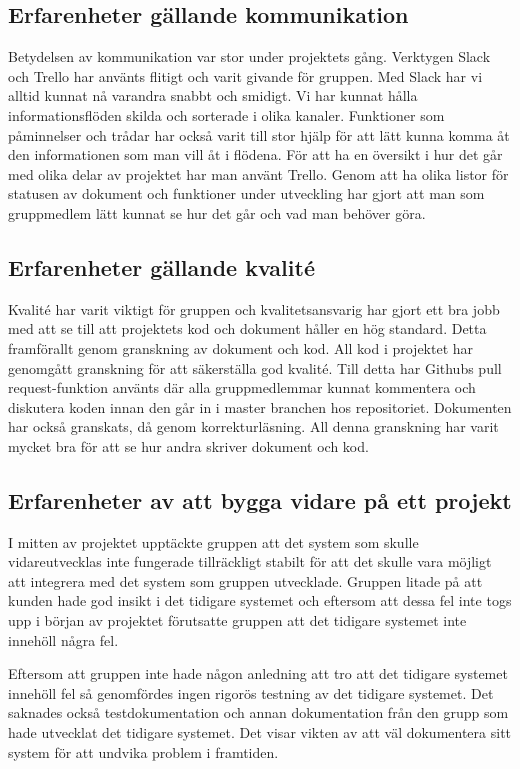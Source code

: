 \subsection{Erfarenheter gällande kommunikation}

Betydelsen av kommunikation var stor under projektets gång. Verktygen Slack och Trello har använts flitigt och varit givande för gruppen. Med Slack har vi alltid kunnat nå varandra snabbt och smidigt. Vi har kunnat hålla informationsflöden skilda och sorterade i olika kanaler. Funktioner som påminnelser och trådar har också varit till stor hjälp för att lätt kunna komma åt den informationen som man vill åt i flödena. För att ha en översikt i hur det går med olika delar av projektet har man använt Trello. Genom att ha olika listor för statusen av dokument och funktioner under utveckling har gjort att man som gruppmedlem lätt kunnat se hur det går och vad man behöver göra. 


\subsection{Erfarenheter gällande kvalité}

Kvalité har varit viktigt för gruppen och kvalitetsansvarig har gjort ett bra jobb med att se till att projektets kod och dokument håller en hög standard. Detta framförallt genom granskning av dokument och kod. All kod i projektet har genomgått granskning för att säkerställa god kvalité. Till detta har Githubs pull request-funktion använts där alla gruppmedlemmar kunnat kommentera och diskutera koden innan den går in i master branchen hos repositoriet. Dokumenten har också granskats, då genom korrekturläsning. All denna granskning har varit mycket bra för att se hur andra skriver dokument och kod.

\subsection{Erfarenheter av att bygga vidare på ett projekt}

I mitten av projektet upptäckte gruppen att det system som skulle vidareutvecklas inte fungerade tillräckligt stabilt för att det skulle vara möjligt att integrera med det system som gruppen utvecklade. Gruppen litade på att kunden hade god insikt i det tidigare systemet och eftersom att dessa fel inte togs upp i början av projektet förutsatte gruppen att det tidigare systemet inte innehöll några fel.

Eftersom att gruppen inte hade någon anledning att tro att det tidigare systemet innehöll fel så genomfördes ingen rigorös testning av det tidigare systemet. Det saknades också testdokumentation och  annan dokumentation från den grupp som hade utvecklat det tidigare systemet. Det visar vikten av att väl dokumentera sitt system för att undvika problem i framtiden.


